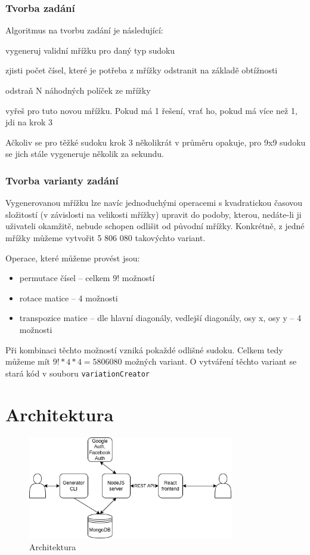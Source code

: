 \documentclass[a4paper,oneside,12pt]{report}
\begin{document}
\subsection{Tvorba zadání}
Algoritmus na tvorbu zadání je následující:
\begin{algEnumerate}
   \item vygeneruj validní mřížku pro daný typ sudoku
   \item zjisti počet čísel, které je potřeba z mřížky odstranit na základě obtížnosti
   \item odstraň N náhodných políček ze mřížky
   \item vyřeš pro tuto novou mřížku. Pokud má 1 řešení, vrať ho, pokud má více než 1, jdi na krok 3
\end{algEnumerate}

Ačkoliv se pro těžké sudoku krok 3 několikrát v průměru opakuje, pro 9x9 sudoku se jich stále vygeneruje několik za sekundu.

\subsection{Tvorba varianty zadání}
Vygenerovanou mřížku lze navíc jednoduchými operacemi s kvadratickou časovou složitostí (v závislosti na velikosti mřížky) upravit do podoby, kterou, nedáte-li ji uživateli okamžitě, nebude schopen odlišit od původní mřížky. Konkrétně, z jedné mřížky můžeme vytvořit 5 806 080 takovýchto variant.

Operace, které můžeme provést jsou:
\begin{itemize}
   \item permutace čísel -- celkem $9!$ možností
   \item rotace matice -- 4 možnosti
   \item transpozice matice -- dle hlavní diagonály, vedlejší diagonály, osy x, osy y -- 4 možnosti
\end{itemize}

Při kombinaci těchto možností vzniká pokaždé odlišné sudoku. Celkem tedy můžeme mít $9! * 4 * 4 = 5 806 080$ možných variant. O vytváření těchto variant se stará kód v souboru \texttt{variationCreator}

\chapter{Architektura}

\begin{figure}[H]
   \centering
   \includegraphics[width=0.8\textwidth]{../img/architecture.png}
   \caption[Architektura]{Architektura}
   \label{fig:architecture}
\end{figure}
\end{document}
